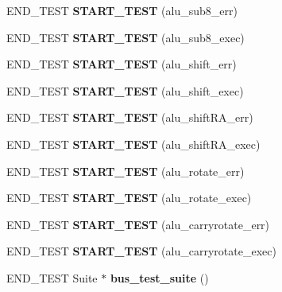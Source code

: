 \begin{DoxyCompactItemize}
E\+N\+D\+\_\+\+T\+E\+ST {\bfseries S\+T\+A\+R\+T\+\_\+\+T\+E\+ST} (alu\+\_\+sub8\+\_\+err)
\item 
\mbox{\label{unit-test-alu_8c_a43ec645b4ac116426f2bc8a7374acd80}} 
E\+N\+D\+\_\+\+T\+E\+ST {\bfseries S\+T\+A\+R\+T\+\_\+\+T\+E\+ST} (alu\+\_\+sub8\+\_\+exec)
\item 
\mbox{\label{unit-test-alu_8c_af8b88a9be00ad6b6ea081bb0ceed8db0}} 
E\+N\+D\+\_\+\+T\+E\+ST {\bfseries S\+T\+A\+R\+T\+\_\+\+T\+E\+ST} (alu\+\_\+shift\+\_\+err)
\item 
\mbox{\label{unit-test-alu_8c_adf08eb5f1c3f34a754d419884968bc43}} 
E\+N\+D\+\_\+\+T\+E\+ST {\bfseries S\+T\+A\+R\+T\+\_\+\+T\+E\+ST} (alu\+\_\+shift\+\_\+exec)
\item 
\mbox{\label{unit-test-alu_8c_abf126dae44b38cd2c770248c212a887e}} 
E\+N\+D\+\_\+\+T\+E\+ST {\bfseries S\+T\+A\+R\+T\+\_\+\+T\+E\+ST} (alu\+\_\+shift\+R\+A\+\_\+err)
\item 
\mbox{\label{unit-test-alu_8c_a89fd052e6ce65ae183e349e702e26028}} 
E\+N\+D\+\_\+\+T\+E\+ST {\bfseries S\+T\+A\+R\+T\+\_\+\+T\+E\+ST} (alu\+\_\+shift\+R\+A\+\_\+exec)
\item 
\mbox{\label{unit-test-alu_8c_aeca7f59a6f771060128f6d07a77fea29}} 
E\+N\+D\+\_\+\+T\+E\+ST {\bfseries S\+T\+A\+R\+T\+\_\+\+T\+E\+ST} (alu\+\_\+rotate\+\_\+err)
\item 
\mbox{\label{unit-test-alu_8c_aa06e3d994ed547a22590f2176b481870}} 
E\+N\+D\+\_\+\+T\+E\+ST {\bfseries S\+T\+A\+R\+T\+\_\+\+T\+E\+ST} (alu\+\_\+rotate\+\_\+exec)
\item 
\mbox{\label{unit-test-alu_8c_a92ab2e5401642e7e7c2e1e197d4d33fb}} 
E\+N\+D\+\_\+\+T\+E\+ST {\bfseries S\+T\+A\+R\+T\+\_\+\+T\+E\+ST} (alu\+\_\+carryrotate\+\_\+err)
\item 
\mbox{\label{unit-test-alu_8c_ac9cd74d38c2bcae7c3827f60b20e3ed1}} 
E\+N\+D\+\_\+\+T\+E\+ST {\bfseries S\+T\+A\+R\+T\+\_\+\+T\+E\+ST} (alu\+\_\+carryrotate\+\_\+exec)
\item 
\mbox{\label{unit-test-alu_8c_a9942b766a70847794d9eba89f6f01b42}} 
E\+N\+D\+\_\+\+T\+E\+ST Suite $\ast$ {\bfseries bus\+\_\+test\+\_\+suite} ()
\end{DoxyCompactItemize}


